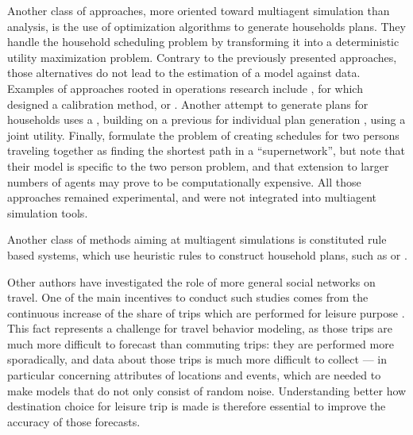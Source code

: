 {%
Another class of approaches,
more oriented toward multiagent simulation than analysis,
is the use of optimization algorithms to generate households plans.
They handle the household scheduling problem by transforming it into a deterministic utility maximization problem.
Contrary to the previously presented approaches,
those alternatives do not lead to the estimation of a model against data.
%
Examples of approaches rooted in operations research include
,
for which 
designed a calibration method,
or .
%
Another attempt to generate plans for households uses a \ga,
building on a previous \ga for individual plan generation
\cite{CharyparNagel_Transportation_2005,MeisterEtAl_Transportation_2005},
using a joint utility.
%
Finally,  formulate the problem of creating
schedules for two persons traveling together as finding the shortest path
in a ``supernetwork'',
but note that their model is specific to the two person problem,
and that extension to larger numbers of agents may prove to be computationally expensive.
%
All those approaches remained experimental,
and were not integrated into multiagent simulation tools.

Another class of methods aiming at multiagent simulations
is constituted rule based systems,
which use heuristic rules to construct household plans,
%
such as
or
%
.

Other authors have investigated the role of more general social networks on travel.
One of the main incentives to conduct such studies comes from the continuous increase of the share of
trips which are performed for leisure purpose
\cite{SchlichEtAl_TransportRev_2004,Axhausen_DonaghyEtAl_2005}.
This fact represents a challenge for travel behavior modeling,
as those trips are much more difficult to forecast than commuting trips:
they are performed more sporadically, and data about those trips is much more difficult to collect
--- in particular concerning attributes of locations and events,
which are needed to make models that do not only consist of random noise.
Understanding better how destination choice for leisure trip is made is therefore essential to improve
the accuracy of those forecasts.

}
